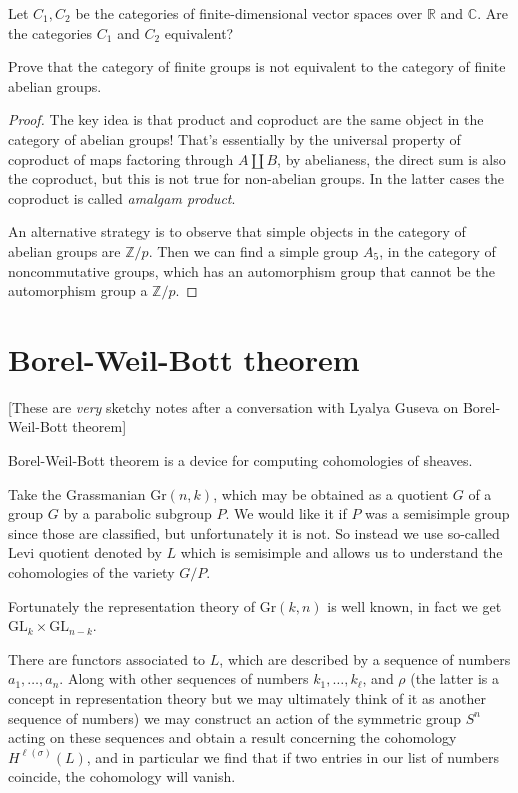\begin{exercise}
\label{exercise-r-vs-c-vect}
Let $C_1,C_2$ be the categories of
finite-dimensional vector spaces over
$\mathbb{R}$ and $\mathbb{C}$. Are the
categories $C_1$ and $C_2$ equivalent?
\end{exercise}

\begin{exercise}
\label{exercise-finite-groups-vs-abelian}
Prove that the category of finite groups is
not equivalent to the category of finite
abelian groups.
\end{exercise}

\begin{proof}
The key idea is that product and coproduct
are the same object in the category of
abelian groups! That's essentially by
the universal property of coproduct
of maps factoring through $A \coprod B$,
by abelianess, the direct sum is
also the coproduct, but this is not
true for non-abelian groups.
In the latter cases the coproduct
is called {\it amalgam product}.

An alternative strategy
is to observe that simple objects in
the category of abelian groups are
$\mathbb{Z}/p$. Then we can find a simple
group $A_5$, in the category
of noncommutative groups,
which has an automorphism group
that cannot be
the automorphism group a $\mathbb{Z}/p$.
\end{proof}

\section{Borel-Weil-Bott theorem}
\label{section-Borel-Weil-Bott-thoerem}

[These are {\it very} sketchy notes after a
conversation with Lyalya Guseva on
Borel-Weil-Bott theorem]

Borel-Weil-Bott theorem is a device for
computing cohomologies of sheaves.

Take the Grassmanian $\text{Gr}(n,k)$, which
may be obtained as a quotient $G$
of a group $G$ by a parabolic subgroup $P$.
We would like it if $P$ was a
semisimple group since those are classified,
but unfortunately it is not.
So instead we use so-called Levi quotient
denoted by $L$ which is semisimple
and allows us to understand the cohomologies
of the variety $G/P$.

Fortunately the representation theory of
$\text{Gr}(k,n)$ is well known, in fact
we get $\text{GL}_k \times \text{GL}_{n-k}$.

There are functors associated to $L$, which
are described by a sequence of
numbers $a_1,\ldots,a_n$. Along with other
sequences of numbers
$k_1,\ldots,k_\ell$, and $\rho$ (the latter
is a concept in representation
theory but we may ultimately think of it as
another sequence of numbers) we may
construct an action of the symmetric group
$S^n$ acting on these sequences and
obtain a result concerning the cohomology
$H^{\ell(\sigma)}(L)$, and in
particular we find that if two entries in our
list of numbers coincide, the
cohomology will vanish.






